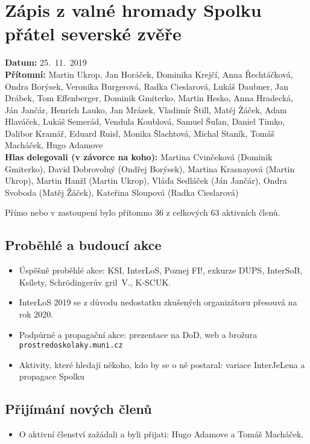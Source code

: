\documentclass[11pt,a4paper]{article}
\begin{document}
\section*{Zápis z valné hromady Spolku přátel severské zvěře}
\textbf{Datum:} 25.~11.~2019\\
\textbf{Přítomní:} Martin Ukrop, Jan Horáček, Dominika Krejčí, Anna Řechtáčková, Ondra Borýsek, Veronika Burgerová, Radka Cieslarová, Lukáš Daubner, Jan Drábek, Tom Effenberger, Dominik Gmiterko, Martin Hesko, Anna Hradecká, Ján Jančár, Henrich Lauko, Jan Mrázek, Vladimír Štill, Matěj Žáček, Adam Hlaváček, Lukáš Semerád, Vendula Koublová, Samuel Šuľan, Daniel Timko, Dalibor Kramář, Eduard Ruisl, Monika Šlachtová, Michal Staník, Tomáš Macháček, Hugo Adamove \\
\textbf{Hlas delegovali (v závorce na koho):} Martina Cvinčeková (Dominik Gmiterko), David Dobrovolný (Ondřej Borýsek), Martina Krasnayová (Martin Ukrop), Martin Hanžl (Martin Ukrop), Vláďa Sedláček (Ján Jančár), Ondra Svoboda (Matěj Žáček), Kateřina Sloupová (Radka Cieslarová)

\vspace{1em}

\noindent Přímo nebo v zastoupení bylo přítomno 36 z celkových 63 aktivních členů.

\subsection*{Proběhlé a budoucí akce}
\begin{itemize}[itemsep=0pt]
\item Úspěšně proběhlé akce: KSI, InterLoS, Poznej FI!, exkurze DUPS, InterSoB, Ksílety, Schrödingerův gril~V., K-SCUK.
\item InterLoS 2019 se z důvodu nedostatku zkušených organizátoru přesouvá na rok 2020.
\item Podpůrné a propagační akce: prezentace na DoD, web a brožura \texttt{prostredoskolaky.muni.cz}
\item Aktivity, které hledají někoho, kdo by se o ně postaral: variace InterJeLena a propagace Spolku
\end{itemize}

\subsection*{Přijímání nových členů}
\begin{itemize}[itemsep=0pt]
\item O aktivní členství zažádali a byli přijati: Hugo Adamove a Tomáš Macháček.
\end{itemize}
\end{document}
